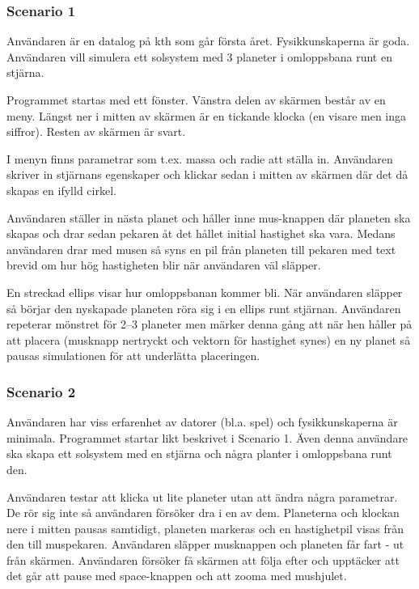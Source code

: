 
\subsubsection*{Scenario 1}

Användaren är en datalog på kth som går första året.
Fysikkunskaperna är goda.
Användaren vill simulera ett solsystem med 3 planeter
i omloppsbana runt en stjärna.

Programmet startas med ett fönster.
Vänstra delen av skärmen består av en meny.
Längst ner i mitten av skärmen är en tickande
klocka (en visare men inga siffror).
Resten av skärmen är svart.

I menyn finns parametrar som t.ex. massa och radie att ställa in.
Användaren skriver in stjärnans egenskaper och klickar
sedan i mitten av skärmen där det då skapas en ifylld cirkel.

Användaren ställer in nästa planet och håller inne mus-knappen där
planeten ska skapas och drar sedan pekaren åt det hållet initial
hastighet ska vara.
Medans användaren drar med musen så syns en pil från planeten till
pekaren med text brevid om hur hög hastigheten blir när användaren väl släpper.

En streckad ellips visar hur omloppsbanan kommer bli.
När användaren släpper så börjar den nyskapade planeten röra sig
i en ellips runt stjärnan.
Användaren repeterar mönstret för 2--3 planeter men märker denna gång
att när hen håller på att placera (musknapp nertryckt och vektorn
för hastighet synes) en ny planet så pausas simulationen för att
underlätta placeringen.

\subsubsection*{Scenario 2}

Användaren har viss erfarenhet av datorer (bl.a. spel) och
fysikkunskaperna är minimala.
Programmet startar likt beskrivet i Scenario 1.
Även denna användare ska skapa ett solsystem med en stjärna
och några planter i omloppsbana runt den.

Användaren testar att klicka ut lite planeter utan att ändra några parametrar.
De rör sig inte så användaren försöker dra i en av dem.
Planeterna och klockan nere i mitten pausas samtidigt,
planeten markeras och
en hastighetpil visas från den till muspekaren.
Användaren släpper musknappen och planeten får fart - ut från skärmen.
Användaren försöker få skärmen att följa efter och
upptäcker att det går att pause med space-knappen och
att zooma med mushjulet.

